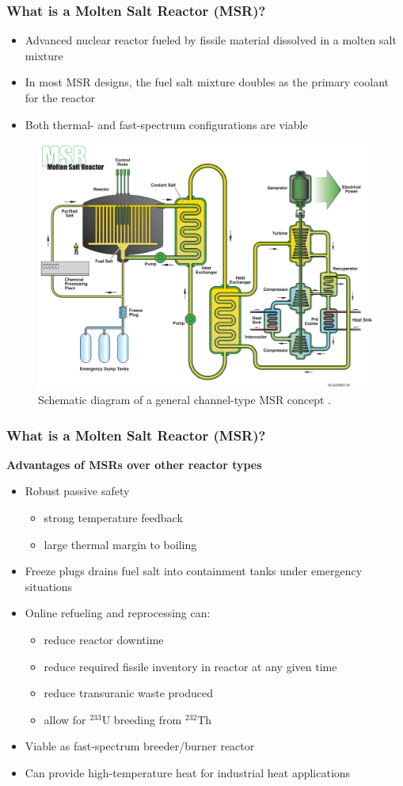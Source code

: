 \begin{frame}
  \frametitle{What is a Molten Salt Reactor (MSR)?}
	\begin{itemize}
	  \item Advanced nuclear reactor fueled by fissile
		material dissolved in a molten salt mixture
	  \item In most MSR designs, the fuel salt mixture doubles as the primary coolant for the
        reactor
	  \item Both thermal- and fast-spectrum configurations are viable
	\end{itemize}
	\begin{figure}
	  \centering
	  \includegraphics[width=.5\textwidth]{./images/msr}
      \caption{Schematic diagram of a general channel-type MSR concept \cite{doe_technology_2002}.}
	  \label{fig:msr}
	\end{figure}
\end{frame}

\begin{frame}
  \frametitle{What is a Molten Salt Reactor (MSR)?}
  \textbf{Advantages of MSRs over other reactor types}
  \begin{itemize}
    \item Robust passive safety
      \begin{itemize}
        \item strong temperature feedback
        \item large thermal margin to boiling
      \end{itemize}
    \item Freeze plugs drains fuel salt into containment tanks under emergency situations
    \item Online refueling and reprocessing can:
      \begin{itemize}
        \item reduce reactor downtime
        \item reduce required fissile inventory in reactor at any given time
        \item reduce transuranic waste produced
        \item allow for $^{233}$U breeding from $^{232}$Th
      \end{itemize}
    \item Viable as fast-spectrum breeder/burner reactor
    \item Can provide high-temperature heat for industrial heat applications
  \end{itemize}
\end{frame}

